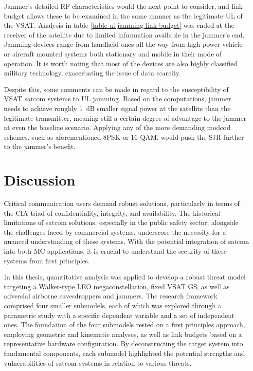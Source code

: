 \documentclass[english, 12pt, a4paper, elec, utf8, a-1b, online]{aaltothesis}
\begin{document}
Jammer's detailed RF characteristics would the next point to consider, and link budget allows these to be examined in the same manner as the legitimate UL of the VSAT.
Analysis in table \ref{table-ul-jamming-link-budget} was ended at the receiver of the satellite due to limited information available in the jammer's end.
Jamming devices range from handheld ones all the way from high power vehicle or aircraft mounted systems both stationary and mobile in their mode of operation.
It is worth noting that most of the devices are also highly classified military technology, exacerbating the issue of data scarcity.

Despite this, some comments can be made in regard to the susceptibility of VSAT satcom systems to UL jamming.
Based on the computations, jammer needs to achieve roughly \SI{1}{\deci\bel} smaller signal power at the satellite than the legitimate transmitter, meaning still a certain degree of advantage to the jammer at even the baseline scenario.
Applying any of the more demanding modcod schemes, such as aforementioned 8PSK or 16-QAM, would push the SJR further to the jammer's benefit.

\clearpage

\section{Discussion}

Critical communication users demand robust solutions, particularly in terms of the CIA triad of confidentiality, integrity, and availability.
The historical limitations of satcom solutions, especially in the public safety sector, alongside the challenges faced by commercial systems, underscore the necessity for a nuanced understanding of these systems.
With the potential integration of satcom into both MC applications, it is crucial to understand the security of these systems from first principles.

In this thesis, quantitative analysis was applied to develop a robust threat model targeting a Walker-type LEO megaconstellation, fixed VSAT GS, as well as adversial airborne eavesdroppers and jammers. The research framework comprised four smaller submodels, each of which was explored through a parametric study with a specific dependent variable and a set of independent ones.
The foundation of the four submodels rested on a first principles approach, employing geometric and kinematic analyses, as well as link budgets based on a representative hardware configuration.
By deconstructing the target system into fundamental components, each submodel highlighted the potential strengths and vulnerabilities of satcom systems in relation to various threats.
\end{document}
